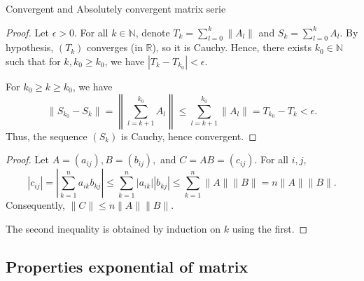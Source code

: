 



{Convergent and Absolutely convergent matrix serie}


\begin{proof}
	Let \( \epsilon > 0 \). For all \( k \in \mathbb{N} \), denote \( T_k = \sum_{l=0}^{k} \|A_l\| \) and \( S_k = \sum_{l=0}^{k} A_l \). By hypothesis, \( (T_k) \) converges (in \( \mathbb{R} \)), so it is Cauchy. Hence, there exists \( k_0 \in \mathbb{N} \) such that for \( k, k_0 \geq k_0 \), we have \( |T_k - T_{k_0}| < \epsilon \).
	
	For \( k_0 \geq k \geq k_0 \), we have
	\[ \|S_{k_0} - S_k\| = \left\| \sum_{l=k+1}^{k_0} A_l \right\| \leq \sum_{l=k+1}^{k_0} \|A_l\| = T_{k_0} - T_k < \epsilon. \]
	Thus, the sequence \( (S_k) \) is Cauchy, hence convergent.
\end{proof}





\begin{proof}
Let \( A = (a_{ij}), B = (b_{ij}), \) and \( C = AB = (c_{ij}) \). For all \( i, j \),
\[ |c_{ij}| = \left| \sum_{k=1}^{n} a_{ik} b_{kj} \right| \leq \sum_{k=1}^{n} |a_{ik}||b_{kj}| \leq \sum_{k=1}^{n} \|A\| \|B\| = n \|A\| \|B\|. \]
Consequently, \( \|C\| \leq n \|A\| \|B\| \).

The second inequality is obtained by induction on \( k \) using the first.
\end{proof}





	
\subsection{Properties exponential of matrix}
	
